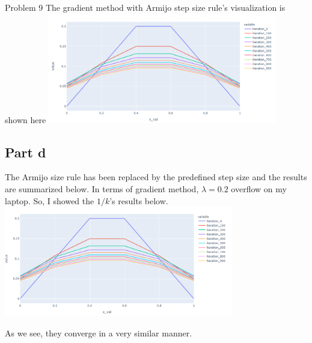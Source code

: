 \documentclass[10pt]{article}
\begin{document}
\begin{section}{Problem 9}
The gradient method with Armijo step size rule's visualization is shown here
\includegraphics[width=10cm]{img/problem9_plt2.png}
\subsection{Part d}
The Armijo size rule has been replaced by the predefined step size and the results are summarized below. In terms of gradient method, $\lambda = 0.2$ overflow on my laptop. So, I showed the $1/k$'s results below. \\
\includegraphics[width=10cm]{img/problem9_plt3.png}

As we see, they converge in a very similar manner. 
\end{section}
\end{document}
